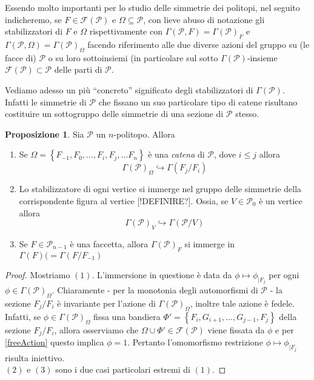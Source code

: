 \documentclass[a4paper,12pt]{report}
\newcommand{\p}{\mathcal{P}}
\theoremstyle{plain}
\theoremstyle{definition}
\newtheorem{prop}[teo]{Proposizione}
\begin{document}
Essendo molto importanti per lo studio delle simmetrie dei politopi, nel seguito indicheremo, se $F\in\mathcal{F}(\p)$ e
$\Omega\subseteq\p$, con lieve abuso di notazione gli stabilizzatori di $F$ e $\Omega$ rispettivamente con $\Gamma(\p,F)=\Gamma(\p)_F$ e
$\Gamma(\p,\Omega)=\Gamma(\p)_\Omega$ facendo riferimento alle due diverse azioni del gruppo su (le facce di) $\p$ o su loro sottoinsiemi
(in particolare sul sotto $\Gamma(\p)$-insieme $\mathcal{F}(\p)\subset\mathcal{P}$ delle parti di $\p$.

Vediamo adesso un pi\`u ``concreto'' significato degli stabilizzatori di $\Gamma(\p)$. Infatti le simmetrie di $\p$ che fissano un suo particolare tipo di
catene risultano costituire un sottogruppo delle simmetrie di una sezione di $\p$ stesso.

\begin{prop}
\label{sectionGroups}
Sia $\p$ un $n$-politopo. Allora
\begin{enumerate}
\item Se $\Omega=\left\{F_{-1},F_0,\dots,F_i,F_j,\dots F_n\right\}$ \`e una \emph{catena} di $\p$, dove $i\leq j$ allora
\begin{equation*}
\Gamma(\p)_\Omega\hookrightarrow\Gamma(F_j/F_i)
\end{equation*}
\item Lo stabilizzatore di ogni vertice si immerge nel gruppo delle simmetrie della corrispondente figura al vertice [!DEFINIRE?]. Ossia, se $V\in\p_0$ \`e un vertice allora
\begin{equation*}
\Gamma(\p)_V\hookrightarrow\Gamma(\p/V)
\end{equation*}
\item Se $F\in\p_{n-1}$ \`e una faccetta, allora $\Gamma(\p)_F$ si immerge in $\Gamma(F)(=\Gamma(F/F_{-1})$
\end{enumerate}
\begin{proof}
Mostriamo $(1)$. L'immersione in questione \`e data da $\phi\mapsto\phi_{\mid F_j}$ per ogni $\phi\in\Gamma(\p)_\Omega$. Chiaramente - per la monotonia degli
automorfismi di $\p$ - la sezione $F_j/F_i$ \`e invariante per l'azione di $\Gamma(\p)_\Omega$,
inoltre tale azione \`e fedele. Infatti, se $\phi\in\Gamma(\p)_\Omega$ fissa una bandiera $\Phi'=\left\{F_i,G_{i+1},\dots,G_{j-1},F_j\right\}$ della sezione
$F_j/F_i$, allora osserviamo che $\Omega\cup\Phi'\in\mathcal{F}(\p)$ viene fissata da $\phi$ e per \ref{freeAction} questo implica $\phi=1$. Pertanto l'omomorfismo restrizione $\phi\mapsto\phi_{\mid F_j}$ risulta iniettivo.\\
$(2)$ e $(3)$ sono i due casi particolari estremi di $(1)$.
\end{proof}
\end{prop}
\end{document}
